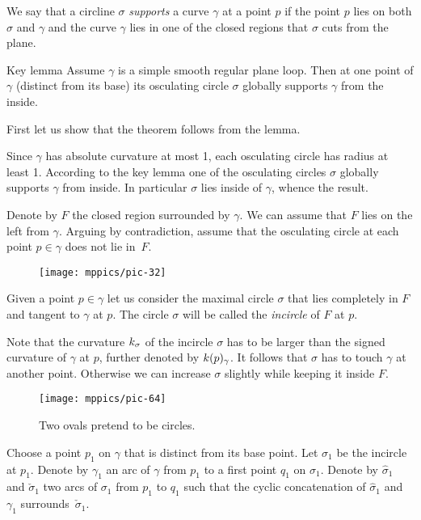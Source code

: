 \documentclass{article}
\begin{document}
We say that a circline $\sigma$ \emph{supports} a curve $\gamma$ at a point $p$ if the point $p$ lies on both $\sigma$ and $\gamma$ and the curve $\gamma$ lies in one of the closed regions that $\sigma$ cuts from the plane.

\begin{thm}{Key lemma}\label{thm:moon}
Assume $\gamma$ is a simple smooth regular plane loop.
Then at one point of $\gamma$ (distinct from its base) its osculating circle $\sigma$ globally supports $\gamma$ from the inside.
\end{thm}

First let us show that the theorem follows from the lemma.

Since $\gamma$ has absolute curvature at most 1, each osculating circle has radius at least 1.
According to the key lemma one of the osculating circles $\sigma$ globally supports $\gamma$ from inside.
In particular $\sigma$ lies inside of $\gamma$, whence the result.
\qeds

Denote by $F$ the closed region surrounded by $\gamma$.
We can assume that $F$ lies on the left from $\gamma$.
Arguing by contradiction,
assume that the osculating circle at each point $p\in \gamma$ does not lie in~$F$.

\begin{figure}[!ht]%
\vskip-0mm
\centering
\texttt{[image: mppics/pic-32]}
\vskip0mm
\end{figure}

Given a point $p\in\gamma$ let us consider the maximal circle $\sigma$ that lies completely in $F$ and tangent to $\gamma$ at $p$.
The circle $\sigma$ will be called the {}\emph{incircle} of $F$ at $p$.

Note that the curvature $k_\sigma$ of the incircle $\sigma$ has to be larger than the signed curvature of $\gamma$ at $p$, further denoted by $k(p)_\gamma$.
It follows that $\sigma$ has to touch $\gamma$ at another point.
Otherwise we can increase $\sigma$ slightly while keeping it inside $F$.

\begin{wrapfigure}{r}{32 mm}
\vskip-4mm
\centering
\texttt{[image: mppics/pic-64]}
\caption*{Two ovals pretend to be circles.}
\vskip0mm
\end{wrapfigure}

Choose a point $p_1$ on $\gamma$ that is distinct from its base point. 
Let $\sigma_1$ be the incircle at $p_1$.
Denote by $\gamma_1$ an arc of $\gamma$ from $p_1$ to a first point $q_1$ on $\sigma_1$.
Denote by $\hat\sigma_1$ and $\check\sigma_1$ two arcs of $\sigma_1$ from $p_1$ to $q_1$ such that the cyclic concatenation of $\hat\sigma_1$ and $\gamma_1$ surrounds~$\check\sigma_1$. 
\end{document}
